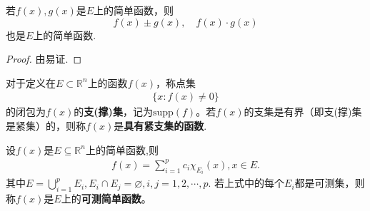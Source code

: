 \documentclass[../../main.tex]{subfiles}%
\begin{document}
\begin{proposition}\label{proposition:简单函数的性质}
若$f(x),g(x)$是$E$上的简单函数，则$$f(x) \pm g(x),\quad f(x) \cdot g(x)$$
也是$E$上的简单函数.
\end{proposition}
\begin{proof}
由易证.
\end{proof}

\begin{definition}
对于定义在$E \subset \mathbb{R}^n$上的函数$f(x)$，称点集
\begin{align*}
\{x: f(x) \neq 0\}
\end{align*}
的闭包为$f(x)$的\textbf{支(撑)集}，记为$\mathrm{supp}(f)$。若$f(x)$的支集是有界（即支(撑)集是紧集）的，则称$f(x)$是\textbf{具有紧支集的函数}. 
\end{definition}

\begin{definition}[可测简单函数]
设$f(x)$是$E\subseteq \mathbb{R}^n$上的简单函数,则
\begin{align*}
f(x)= \sum_{i = 1}^{p} c_i \chi_{E_i}(x),x \in E.
\end{align*}
其中$E = \bigcup_{i = 1}^{p} E_i,  E_i \cap E_j = \varnothing, i, j = 1, 2, \cdots, p.$
若上式中的每个$E_i$都是可测集，则称$f(x)$是$E$上的\textbf{可测简单函数}。
\end{definition}
\end{document}
